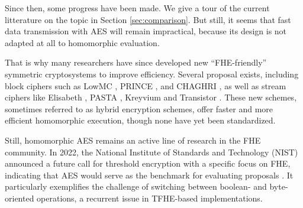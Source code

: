 Since then, some progress have been made. We give a tour of the current litterature on the topic in Section \ref{sec:comparison}. But still, it seems that fast data transmission with AES will remain impractical, because its design is not adapted at all to homomorphic evaluation.


That is why many researchers have since developed new ``FHE-friendly'' symmetric cryptosystems to improve efficiency. Several proposal exists, including block ciphers such as LowMC \cite{EC:ARSTZ15}, PRINCE \cite{AC:BCGKKK12}, and CHAGHRI \cite{CCS:AshMahTop22}, as well as stream ciphers like Elisabeth \cite{AC:CHMS22}, PASTA \cite{TCHES:DGHRSW23}, Kreyvium \cite{FSE:CCFLNP16} and Transistor \cite{EPRINT:BBBBCL25}. These new schemes, sometimes referred to as hybrid encryption schemes, offer faster and more efficient homomorphic execution, though none have yet been standardized.


Still, homomorphic AES remains an active line of research in the FHE community. In 2022, the National Institute of Standards and Technology (NIST) announced a future call for threshold encryption with a specific focus on FHE, indicating that AES would serve as the benchmark for evaluating proposals \cite{call_nist}. It particularly exemplifies the challenge of switching between boolean- and byte-oriented operations, a recurrent issue in TFHE-based implementations.



